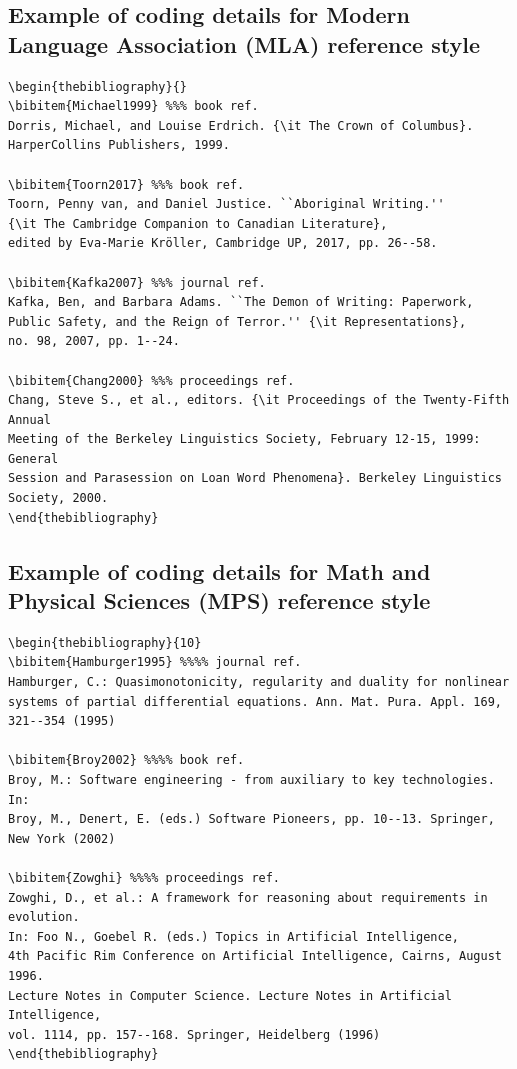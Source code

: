\documentclass[11pt]{article}
\begin{document}
\subsection{Example of coding details for Modern Language Association (MLA) reference style}
\begin{verbatim}
\begin{thebibliography}{}
\bibitem{Michael1999} %%% book ref.
Dorris, Michael, and Louise Erdrich. {\it The Crown of Columbus}.
HarperCollins Publishers, 1999.

\bibitem{Toorn2017} %%% book ref.
Toorn, Penny van, and Daniel Justice. ``Aboriginal Writing.''
{\it The Cambridge Companion to Canadian Literature},
edited by Eva-Marie Kröller, Cambridge UP, 2017, pp. 26--58.

\bibitem{Kafka2007} %%% journal ref.
Kafka, Ben, and Barbara Adams. ``The Demon of Writing: Paperwork,
Public Safety, and the Reign of Terror.'' {\it Representations},
no. 98, 2007, pp. 1--24.

\bibitem{Chang2000} %%% proceedings ref.
Chang, Steve S., et al., editors. {\it Proceedings of the Twenty-Fifth Annual
Meeting of the Berkeley Linguistics Society, February 12-15, 1999: General
Session and Parasession on Loan Word Phenomena}. Berkeley Linguistics
Society, 2000.
\end{thebibliography}
\end{verbatim}

\subsection{Example of coding details for Math and Physical Sciences (MPS) reference style}
\begin{verbatim}
\begin{thebibliography}{10}
\bibitem{Hamburger1995} %%%% journal ref.
Hamburger, C.: Quasimonotonicity, regularity and duality for nonlinear
systems of partial differential equations. Ann. Mat. Pura. Appl. 169,
321--354 (1995)

\bibitem{Broy2002} %%%% book ref.
Broy, M.: Software engineering - from auxiliary to key technologies. In:
Broy, M., Denert, E. (eds.) Software Pioneers, pp. 10--13. Springer,
New York (2002)

\bibitem{Zowghi} %%%% proceedings ref.
Zowghi, D., et al.: A framework for reasoning about requirements in evolution.
In: Foo N., Goebel R. (eds.) Topics in Artificial Intelligence,
4th Pacific Rim Conference on Artificial Intelligence, Cairns, August 1996.
Lecture Notes in Computer Science. Lecture Notes in Artificial Intelligence,
vol. 1114, pp. 157--168. Springer, Heidelberg (1996)
\end{thebibliography}
\end{verbatim}
\end{document}
